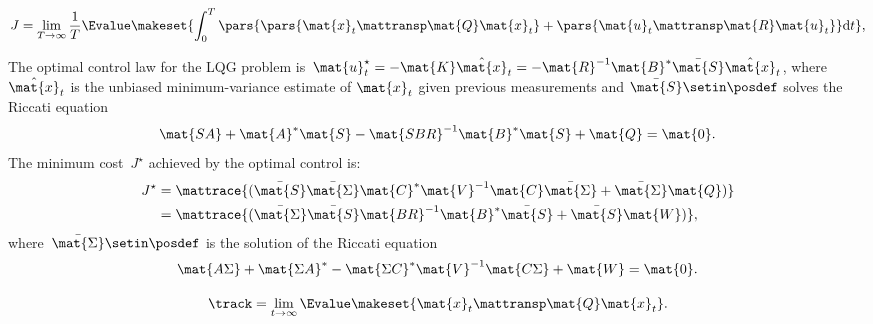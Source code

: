 {\begin{forslides}
    \begin{equation}
        \label{eq:general_continuous_cost}
        J=\lim_{T\to \infty} \frac{1}{T}\Evalue\makeset{\int_{0}^{T} \pars{\pars{ \mat{x}_t\mattransp \mat{Q} \mat{x}_t}+\pars{\mat{u}_t\mattransp \mat{R}\mat{u}_t}} \text{d} t},
    \end{equation}

    \begin{lemma}
        \label{lem:lqgstandard}
        The optimal control law for the LQG problem is~$\mat{u}_t^\star =-\mat{K}\hat{\mat{x}}_t=-\mat{R}^{-1}\mat{B}^*\bar{\mat{S}}\hat{\mat{x}}_t$, where $\hat{\mat{x}}_t$ is the unbiased minimum-variance estimate of $\mat{x}_t$ given previous measurements and $\bar{\mat{S}}\setin \posdef$ solves the Riccati equation
        \begin{equation}
            \label{eq:cont_ric_1}
            \mat{SA}+\mat{A}^*\mat{S}-\mat{SBR}^{-1}\mat{B}^*\mat{S}+\mat{Q}=\mat{0}.
        \end{equation}
        The minimum cost~$J^\star$ achieved by the optimal control is:
        \begin{equation}
            \label{eq:contmincost}
            \begin{aligned}
                J^\star & =\mattrace{(\bar{\mat{S}}\bar{\mat{\Sigma}}\mat{C}^*\mat{V}^{-1}\mat{C}\bar{\mat{\Sigma}}+\bar{\mat{\Sigma}}\mat{Q})} \\
                        & =\mattrace{(\bar{\mat{\Sigma}}\bar{\mat{S}}\mat{BR}^{-1}\mat{B}^*\bar{\mat{S}}+\bar{\mat{S}}\mat{W})},
            \end{aligned}
        \end{equation}
        where~$\bar{\mat{\Sigma}}\setin \posdef$ is the solution of the Riccati equation
        \begin{equation}
            \label{eq:cont_ric_2}
            \mat{A\Sigma} + \mat{\Sigma A}^*-\mat{\Sigma C}^*\mat{V}^{-1}\mat{C\Sigma}+\mat{W}=\mat{0}.
        \end{equation}
    \end{lemma}

    \begin{equation}
        \label{eq:ptrack}
        \track=\lim_{t\to \infty}\Evalue\makeset{\mat{x}_t\mattransp \mat{Q}\mat{x}_t}.
    \end{equation}


\end{forslides}}
